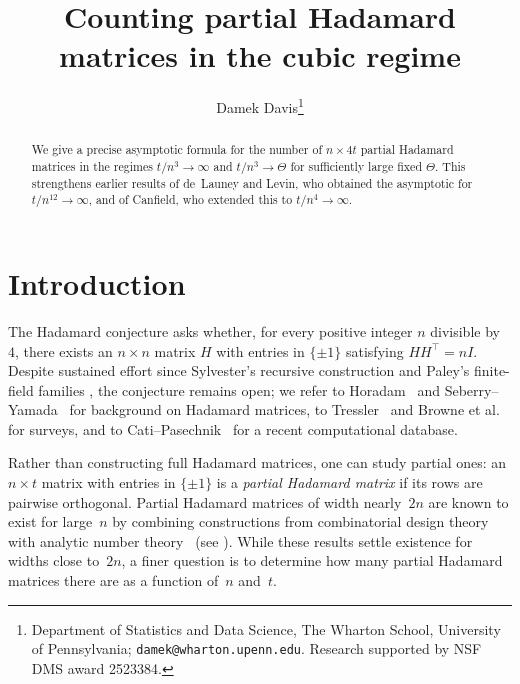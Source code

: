 \documentclass[11pt]{article}
\title{Counting partial Hadamard matrices in the cubic regime}
\author{Damek Davis\thanks{Department of Statistics and Data Science, The Wharton School, University of Pennsylvania; \texttt{damek@wharton.upenn.edu}. Research supported by NSF DMS award 2523384.}}
\date{}
\theoremstyle{definition}
\begin{document}
\maketitle

\begin{abstract}
We give a precise asymptotic formula for the number of \(n\times 4t\) partial Hadamard matrices in the regimes \(t/n^3\to\infty\) and \(t/n^3\to\Theta\) for sufficiently large fixed \(\Theta\). This strengthens earlier results of de~Launey and Levin, who obtained the asymptotic for \(t/n^{12}\to\infty\), and of Canfield, who extended this to \(t/n^4\to\infty\).
\end{abstract}

\section{Introduction}

The Hadamard conjecture asks whether, for every positive integer \(n\) divisible by~\(4\), there exists an \(n\times n\) matrix \(H\) with entries in \(\{\pm1\}\) satisfying \(HH^\top = nI\). Despite sustained effort since Sylvester's recursive construction \cite{Syl1867} and Paley's finite-field families \cite{Pal1933}, the conjecture remains open; we refer to Horadam~\cite{Hor2012} and Seberry--Yamada~\cite{SY2020} for background on Hadamard matrices, to Tressler~\cite{Tre2004} and Browne et al.~\cite{BEHOC2021} for surveys, and to Cati--Pasechnik~\cite{CP2024} for a recent computational database.

Rather than constructing full Hadamard matrices, one can study partial ones: an \(n\times t\) matrix with entries in \(\{\pm 1\}\) is a \emph{partial Hadamard matrix} if its rows are pairwise orthogonal. Partial Hadamard matrices of width nearly~\(2n\) are known to exist for large~\(n\) by combining constructions from combinatorial design theory~\cite{Crai1995,dLG2001} with analytic number theory~\cite{GS2008} (see \cite[Theorem~A]{DL10}). While these results settle existence for widths close to~\(2n\), a finer question is to determine how many partial Hadamard matrices there are as a function of~\(n\) and~\(t\).
\end{document}
